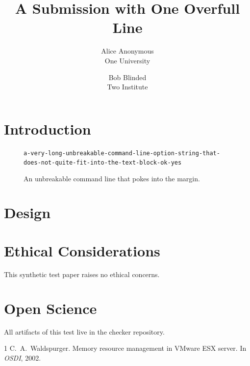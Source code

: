 \documentclass[letterpaper,twocolumn,10pt]{article}
\date{}
\title{\Large \bf A Submission with One Overfull Line}
\author{{\rm Alice Anonymous}\\One University \and {\rm Bob Blinded}\\Two Institute}
\begin{document}
\maketitle

\begin{abstract}
\lipsum[1][1-5]
\end{abstract}

\section{Introduction}
\lipsum[2-4]

\begin{figure}[t]
  \noindent
  \mbox{\texttt{a-very-long-unbreakable-command-line-option-string-that-does-not-quite-fit-into-the-text-block-ok-yes}}
  \caption{An unbreakable command line that pokes into the margin.}
\end{figure}

\section{Design}
\lipsum[5-7]

\appendix
\section*{Ethical Considerations}
This synthetic test paper raises no ethical concerns.

\section*{Open Science}
All artifacts of this test live in the checker repository.

\begin{thebibliography}{1}
 C.~A.\ Waldspurger. Memory resource management in VMware ESX
  server. In \emph{OSDI}, 2002.
\end{thebibliography}
\end{document}
